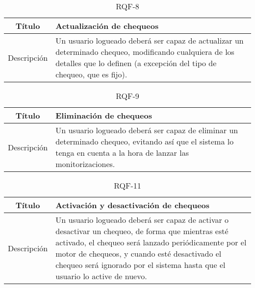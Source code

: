\begin{table}[h!]
  \centering
  \begin{tabularx}{\textwidth}{|c|X|}
    \hline
    Título & Actualización de chequeos \\

    \hline

    Descripción & Un usuario logueado deberá ser capaz de actualizar un
    determinado chequeo, modificando cualquiera de los detalles que lo definen
    (a excepción del tipo de chequeo, que es fijo). \\

    \hline
  \end{tabularx}
  \caption{RQF-8}
\end{table}

\begin{table}[h!]
  \centering
  \begin{tabularx}{\textwidth}{|c|X|}
    \hline
    Título & Eliminación de chequeos \\

    \hline

    Descripción & Un usuario logueado deberá ser capaz de eliminar un
    determinado chequeo, evitando así que el sistema lo tenga en cuenta a la
    hora de lanzar las monitorizaciones. \\

    \hline
  \end{tabularx}
  \caption{RQF-9}
\end{table}

\begin{table}[h!]
  \centering
  \begin{tabularx}{\textwidth}{|c|X|}
    \hline
    Título & Activación y desactivación de chequeos \\

    \hline

    Descripción & Un usuario logueado deberá ser capaz de activar o desactivar
    un chequeo, de forma que mientras esté activado, el chequeo será lanzado
    periódicamente por el motor de chequeos, y cuando esté desactivado el
    chequeo será ignorado por el sistema hasta que el usuario lo active de
    nuevo. \\

    \hline
  \end{tabularx}
  \caption{RQF-11}
\end{table}

